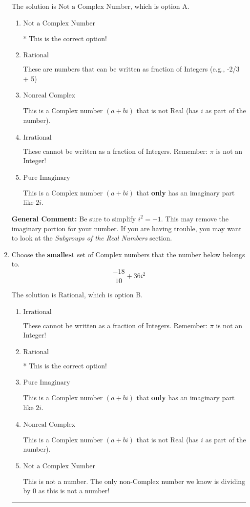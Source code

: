 \documentclass{extbook}[14pt]
\newcommand{\litem}[1]{\item #1

\rule{\textwidth}{0.4pt}}
\begin{document}
\begin{enumerate}
{The solution is \( \text{Not a Complex Number} \), which is option A.\begin{enumerate}[label=\Alph*.]
\item \( \text{Not a Complex Number} \)

* This is the correct option!
\item \( \text{Rational} \)

These are numbers that can be written as fraction of Integers (e.g., -2/3 + 5)
\item \( \text{Nonreal Complex} \)

This is a Complex number $(a+bi)$ that is not Real (has $i$ as part of the number).
\item \( \text{Irrational} \)

These cannot be written as a fraction of Integers. Remember: $\pi$ is not an Integer!
\item \( \text{Pure Imaginary} \)

This is a Complex number $(a+bi)$ that \textbf{only} has an imaginary part like $2i$.
\end{enumerate}

\textbf{General Comment:} Be sure to simplify $i^2 = -1$. This may remove the imaginary portion for your number. If you are having trouble, you may want to look at the \textit{Subgroups of the Real Numbers} section.
}
\litem{
Choose the \textbf{smallest} set of Complex numbers that the number below belongs to.
\[ \frac{-18}{10}+36i^2 \]

The solution is \( \text{Rational} \), which is option B.\begin{enumerate}[label=\Alph*.]
\item \( \text{Irrational} \)

These cannot be written as a fraction of Integers. Remember: $\pi$ is not an Integer!
\item \( \text{Rational} \)

* This is the correct option!
\item \( \text{Pure Imaginary} \)

This is a Complex number $(a+bi)$ that \textbf{only} has an imaginary part like $2i$.
\item \( \text{Nonreal Complex} \)

This is a Complex number $(a+bi)$ that is not Real (has $i$ as part of the number).
\item \( \text{Not a Complex Number} \)

This is not a number. The only non-Complex number we know is dividing by 0 as this is not a number!
\end{enumerate}

}
\end{enumerate}
\end{document}
